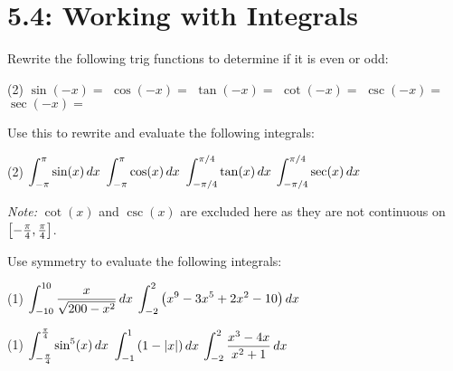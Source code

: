 \documentclass[mathNotesPreamble]{subfiles}
\begin{document}
\section{5.4: Working with Integrals}


\begin{ex*}
  Rewrite the following trig functions to determine if it is even or odd:
  \begin{tasks}[label=\mbox{}](2)
    \task $\sin(-x)=$
    \task $\cos(-x)=$
    \task $\tan(-x)=$
    \task $\cot(-x)=$
    \task $\csc(-x)=$
    \task $\sec(-x)=$
  \end{tasks}
  Use this to rewrite and evaluate the following integrals:
\end{ex*}
\begin{tasks}[after-item-skip=\stretch{1}, label=\mbox{}](2)
  \task $\displaystyle\int_{-\pi}^\pi \sin(x)\,dx$
  \task $\displaystyle\int_{-\pi}^\pi \cos(x)\,dx$
  \task $\displaystyle\int_{-\pi/4}^{\pi/4} \tan(x)\,dx$
  \task $\displaystyle\int_{-\pi/4}^{\pi/4} \sec(x)\,dx$
\end{tasks}
\textit{Note:} $\cot(x)$ and $\csc(x)$ are excluded here as they are not continuous on ${\left[-\frac{\pi}{4},\frac{\pi}{4}\right]}$.

\vspace*{-\baselineskip}
\pagebreak

\begin{ex*}
  Use symmetry to evaluate the following integrals:
\end{ex*}
\begin{tasks}[after-item-skip=\stretch{1}](1)
  \task $\displaystyle\int_{-10}^{10} \frac{x}{\sqrt{200-x^2}}\,dx$
  \task $\displaystyle\int_{-2}^{2}{\left(x^9-3x^5+2x^2-10\right)}\,dx$
\end{tasks}
\pagebreak

\begin{tasks}[after-item-skip=\stretch{1}, resume](1)
  \task $\displaystyle\int_{-\frac{\pi}{4}}^{\frac{\pi}{4}}\sin^5(x)\,dx$
  \task $\displaystyle\int_{-1}^{1}{\left(1-{\left\vert x\right\vert}\right)}\,dx$
  \task $\displaystyle\int_{-2}^{2}\frac{x^3-4x}{x^2+1}\,dx$
\end{tasks}
\pagebreak
\end{document}
